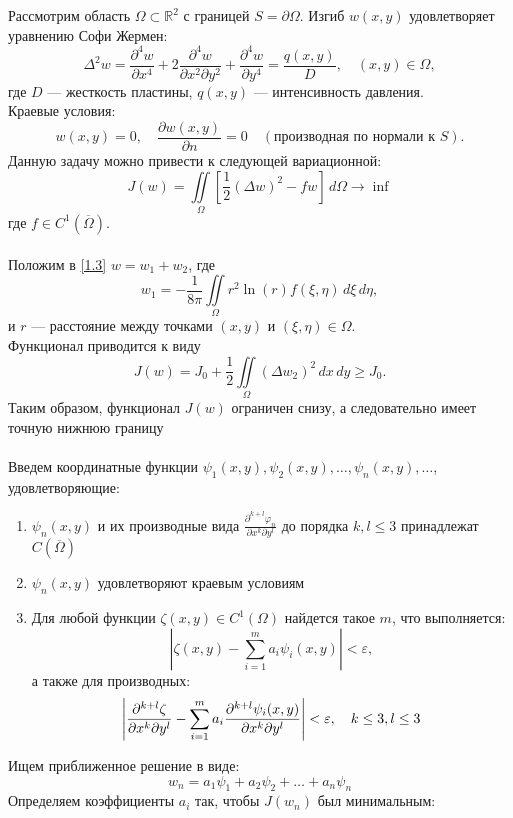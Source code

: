 Рассмотрим область \( \Omega \subset \mathbb{R}^2 \) с границей \( S = \partial \Omega \). Изгиб \( w(x, y) \) удовлетворяет уравнению Софи Жермен:
\[
\Delta^2 w = \frac{\partial^4 w}{\partial x^4} + 2 \frac{\partial^4 w}{\partial x^2 \partial y^2} + \frac{\partial^4 w}{\partial y^4} = \frac{q(x, y)}{D}, \quad (x, y) \in \Omega,
\]
где \( D \) --- жесткость пластины, \( q(x, y) \) --- интенсивность давления. \\
Краевые условия:
\[
w(x, y) = 0, \quad \frac{\partial w(x, y)}{\partial n} = 0 \quad ( \text{производная по нормали к } S).
\]
Данную задачу можно привести к следующей вариационной:
\[
J(w) = \iint\limits_{\Omega} \left[ \frac{1}{2} (\Delta w)^2 - f w \right] \, d\Omega \rightarrow \inf
\tag{1.3}
\label{1.3}
\]
где \( f \in C^{1}(\overline{\Omega}) \). \\ \\
Положим в \eqref{1.3} \( w = w_1 + w_2 \), где
\[
w_1 = - \frac{1}{8\pi} \iint\limits_{\Omega} r^2 \ln (r) f(\xi, \eta) \, d\xi \, d\eta,
\]
и \( r \) --- расстояние между точками \( (x, y) \) и \( (\xi, \eta) \in \Omega \). \\
Функционал приводится к виду
\[
J(w) = J_0 + \frac{1}{2} \iint\limits_{\Omega} (\Delta w_2)^2 \, dx \, dy \geq J_0.
\]
Таким образом, функционал \( J(w) \) ограничен снизу, а следовательно имеет точную нижнюю границу \\ \\
Введем координатные функции \( \psi_1(x, y), \psi_2(x, y), \ldots, \psi_n(x, y), \ldots \), удовлетворяющие:
\begin{enumerate}
	\item \( \psi_n(x, y) \) и их производные вида \( \frac{\partial^{k+l} \varphi_n}{\partial x^k \partial y^l} \) до порядка \( k, l \leq 3 \) принадлежат \( C(\overline{\Omega}) \)
	\item \( \psi_n(x, y) \) удовлетворяют краевым условиям
	\item Для любой функции \( \zeta(x, y) \in C^1(\Omega) \) найдется такое \(m\), что выполняется:
	\[
	|\zeta(x, y) - \sum_{i=1}^{m} a_i \psi_i(x, y)| < \varepsilon,
	\]
	а также для производных:
	\[
	\left| \frac{\partial^{k+l} \zeta}{\partial x^k \partial y^l} - \sum\limits_{i=1}^{m} a_i \frac{\partial^{k+l} \psi_i(x, y)}{\partial x^k \partial y^l} \right| < \varepsilon, \quad k \leq 3, l \leq 3
	\]
\end{enumerate}
Ищем приближенное решение в виде:
\[
w_n = a_1 \psi_1 + a_2 \psi_2 + \ldots + a_n \psi_n
\]
Определяем коэффициенты \( a_i \) так, чтобы \( J(w_n) \) был минимальным:
